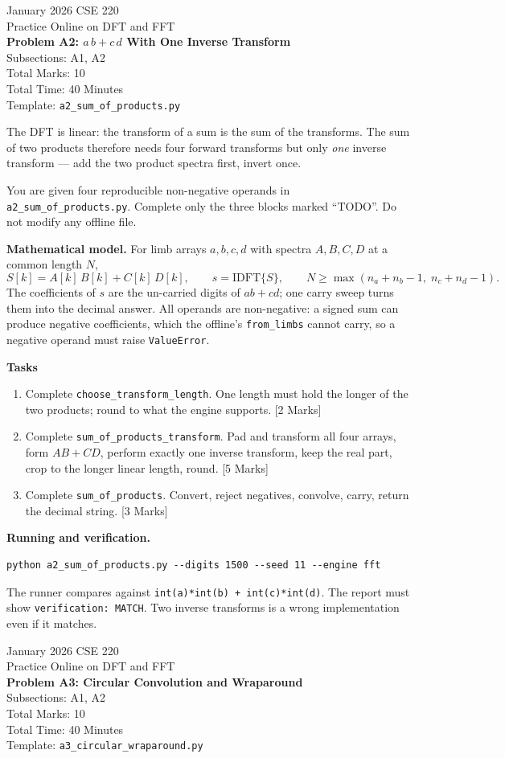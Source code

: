 \documentclass[11pt]{article}
\newcommand{\file}[1]{\texttt{#1}}
\newcommand{\code}[1]{\texttt{#1}}
\newcommand{\problemheader}[3]{%
  \begin{center}
    {\large January 2026 CSE 220}\\
    {\large Practice Online on DFT and FFT}\\[2pt]
    {\Large\bfseries #1}\\[2pt]
    Subsections: #2\\
    Total Marks: 10\\
    Total Time: 40 Minutes\\[2pt]
    {\small Template: \file{#3}}
  \end{center}
  \vspace{4pt}
}
\begin{document}
\newpage
\problemheader{Problem A2: $a\,b + c\,d$ With One Inverse Transform}{A1, A2}{a2\_sum\_of\_products.py}

The DFT is linear: the transform of a sum is the sum of the transforms. The sum
of two products therefore needs four forward transforms but only \emph{one}
inverse transform --- add the two product spectra first, invert once.

You are given four reproducible non-negative operands in
\file{a2\_sum\_of\_products.py}. Complete only the three blocks marked ``TODO''.
Do not modify any offline file.

\textbf{Mathematical model.} For limb arrays $a, b, c, d$ with spectra
$A, B, C, D$ at a common length $N$,
\[
  S[k] = A[k]\,B[k] + C[k]\,D[k], \qquad s = \mathrm{IDFT}\{S\},
  \qquad N \ge \max(n_a + n_b - 1,\; n_c + n_d - 1).
\]
The coefficients of $s$ are the un-carried digits of $a b + c d$; one carry
sweep turns them into the decimal answer. All operands are non-negative: a
signed sum can produce negative coefficients, which the offline's
\code{from\_limbs} cannot carry, so a negative operand must raise
\code{ValueError}.

\textbf{Tasks}
\begin{enumerate}[nosep]
  \item Complete \code{choose\_transform\_length}. One length must hold the
        longer of the two products; round to what the engine supports.
        \hfill [2 Marks]
  \item Complete \code{sum\_of\_products\_transform}. Pad and transform all
        four arrays, form $AB + CD$, perform exactly one inverse transform,
        keep the real part, crop to the longer linear length, round.
        \hfill [5 Marks]
  \item Complete \code{sum\_of\_products}. Convert, reject negatives, convolve,
        carry, return the decimal string.
        \hfill [3 Marks]
\end{enumerate}

\textbf{Running and verification.}
\begin{lstlisting}
python a2_sum_of_products.py --digits 1500 --seed 11 --engine fft
\end{lstlisting}
The runner compares against \code{int(a)*int(b) + int(c)*int(d)}. The report
must show \code{verification: MATCH}. Two inverse transforms is a wrong
implementation even if it matches.

\newpage
\problemheader{Problem A3: Circular Convolution and Wraparound}{A1, A2}{a3\_circular\_wraparound.py}
\end{document}
